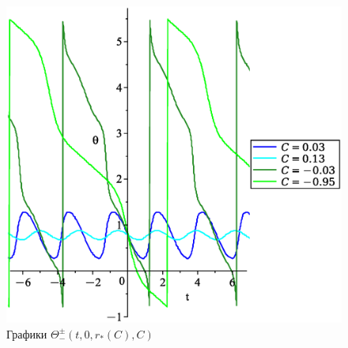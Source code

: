 \begin{figure}[ht!]%
    \begin{center}
    \includegraphics[scale = 0.48]{thetan2.eps}
    \caption{Графики $\Theta_-^\pm(t,0,r_*(C), C)$}%
    \label{fig:eight}
    \end{center}%
\end{figure}

